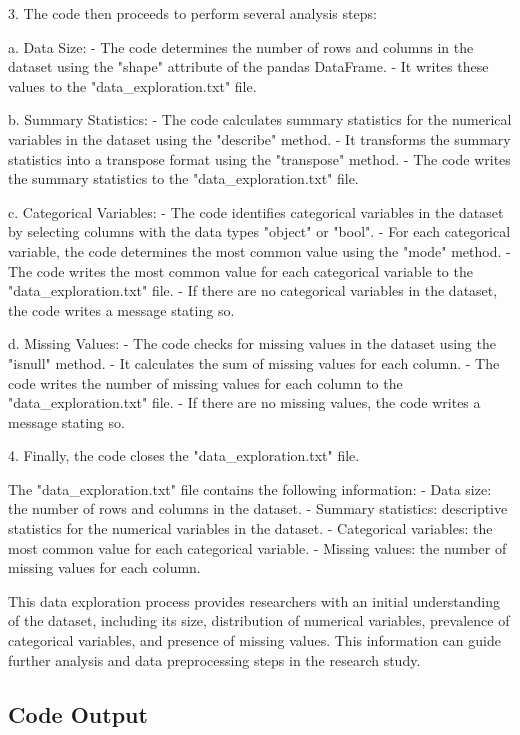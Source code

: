 \documentclass[11pt]{article}
\begin{document}
3. The code then proceeds to perform several analysis steps:

    a. Data Size:
        - The code determines the number of rows and columns in the dataset using the "shape" attribute of the pandas DataFrame.
        - It writes these values to the "data\_exploration.txt" file.
    
    b. Summary Statistics:
        - The code calculates summary statistics for the numerical variables in the dataset using the "describe" method.
        - It transforms the summary statistics into a transpose format using the "transpose" method.
        - The code writes the summary statistics to the "data\_exploration.txt" file.
    
    c. Categorical Variables:
        - The code identifies categorical variables in the dataset by selecting columns with the data types "object" or "bool".
        - For each categorical variable, the code determines the most common value using the "mode" method.
        - The code writes the most common value for each categorical variable to the "data\_exploration.txt" file.
        - If there are no categorical variables in the dataset, the code writes a message stating so.
    
    d. Missing Values:
        - The code checks for missing values in the dataset using the "isnull" method.
        - It calculates the sum of missing values for each column.
        - The code writes the number of missing values for each column to the "data\_exploration.txt" file.
        - If there are no missing values, the code writes a message stating so.

4. Finally, the code closes the "data\_exploration.txt" file.

The "data\_exploration.txt" file contains the following information:
- Data size: the number of rows and columns in the dataset.
- Summary statistics: descriptive statistics for the numerical variables in the dataset.
- Categorical variables: the most common value for each categorical variable.
- Missing values: the number of missing values for each column.

This data exploration process provides researchers with an initial understanding of the dataset, including its size, distribution of numerical variables, prevalence of categorical variables, and presence of missing values. This information can guide further analysis and data preprocessing steps in the research study.

\subsection{Code Output}
\end{document}
